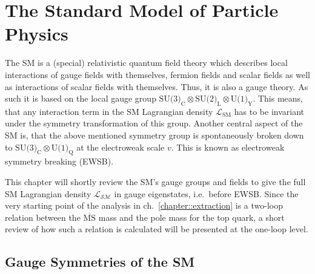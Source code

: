 \documentclass[a4paper,12pt]{book}
\begin{document}
\chapter{The Standard Model of Particle Physics}
\label{chapter::SM}
The SM is a (special) relativistic quantum field theory which describes local interactions of gauge fields with themselves, fermion fields and scalar fields as well as interactions of scalar fields with themselves. Thus, it is also a gauge theory. As such it is based on the local gauge group $\text{SU(3)}_{ \text{C}} \otimes \text{SU(2)}_{ \text{L}} \otimes \text{U(1)}_{ \text{Y}}$. This means, that any interaction term in the SM Lagrangian density $\mathcal{L}_\text{SM}$ has to be invariant under the symmetry transformation of this group. Another central aspect of the SM is, that the above mentioned symmetry group is spontaneously broken down to $\text{SU(3)}_{\text{C}} \otimes \text{U(1)}_{\text{Q}}$ at the electroweak scale $v$. This is known as electroweak symmetry breaking (EWSB).\par
This chapter will shortly review the SM's gauge groups and fields to give the full SM Lagrangian density $\mathcal{L_\text{SM}}$ in gauge eigenstates, i.e.\ before EWSB. Since the very starting point of the analysis in ch.\ \ref{chapter::extraction} is a two-loop relation between the $\overline{\text{MS}}$ mass and the pole mass for the top quark, a short review of how such a relation is calculated will be presented at the one-loop level. 
\section{Gauge Symmetries of the SM}
\end{document}
